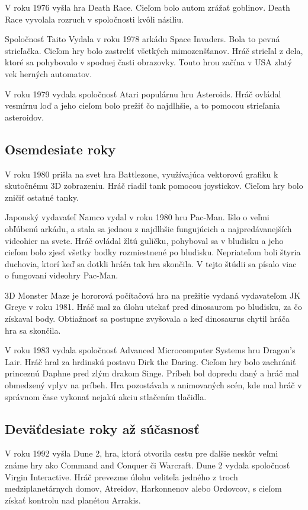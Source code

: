 \documentclass[10pt,oneside,slovak,a4paper]{article}
\begin{document}
V roku 1976 vyšla hra Death Race. Cieľom bolo autom zrážať goblinov. Death Race vyvolala rozruch v spoločnosti kvôli násiliu.

Spoločnosť Taito Vydala v roku 1978 arkádu Space Invaders. Bola to pevná strieľačka. Cieľom hry bolo zastreliť všetkých mimozenšťanov. Hráč strieľal z dela, ktoré sa pohybovalo v spodnej časti obrazovky. Touto hrou začína v USA zlatý vek herných automatov.

V roku 1979 vydala spoločnosť Atari populárnu hru Asteroids. Hráč ovládal vesmírnu loď a jeho cieľom bolo prežiť čo najdlhšie, a to pomocou strieľania asteroidov.

\pagebreak

\subsection{Osemdesiate roky} \label{osemdesiate}
V roku 1980 prišla na svet hra Battlezone, využívajúca vektorovú grafiku k skutočnému 3D zobrazeniu. Hráč riadil tank pomocou joystickov. Cieľom hry bolo zničiť ostatné tanky.

Japonský vydavaťeľ Namco vydal v roku 1980 hru Pac-Man. Išlo o veľmi obľúbenú arkádu, a stala sa jednou z najdlhšie fungujúcich a najpredávanejších videohier na svete. Hráč ovládal žltú guličku, pohyboval sa v bludisku a jeho cieľom bolo zjesť všetky bodky rozmiestnené po bludisku. Nepriateľom boli štyria duchovia, ktorí keď sa dotkli hráča tak hra skončila. V tejto štúdii sa písalo viac o fungovaní videohry Pac-Man\cite{SRVSS20}.

3D Monster Maze je hororová počítačová hra na prežitie vydaná vydavateľom JK Greye v roku 1981. Hráč mal za úlohu utekať pred dinosaurom po bludisku, za čo získaval body. Obtiažnosť sa postupne zvyšovala a keď dinosaurus chytil hráča hra sa skončila.

V roku 1983 vydala spoločnosť Advanced Microcomputer Systems hru Dragon's Lair. Hráč hral za hrdinskú postavu Dirk the Daring. Cieľom hry bolo zachrániť princeznú Daphne pred zlým drakom Singe. Príbeh bol dopredu daný a hráč mal obmedzený vplyv na príbeh. Hra pozostávala z animovaných scén, kde mal hráč v správnom čase vykonať nejakú akciu stlačením tlačidla.

\subsection{Deväťdesiate roky až súčasnosť} \label{devatdesiate}
V roku 1992 vyšla Dune 2, hra, ktorá otvorila cestu pre ďalšie neskôr veľmi známe hry ako Command and Conquer či Warcraft. Dune 2 vydala spoločnosť Virgin Interactive. Hráč prevezme úlohu veliteľa jedného z troch medziplanetárnych domov, Atreidov, Harkonnenov alebo Ordovcov, s cieľom získať kontrolu nad planétou Arrakis.
\end{document}

